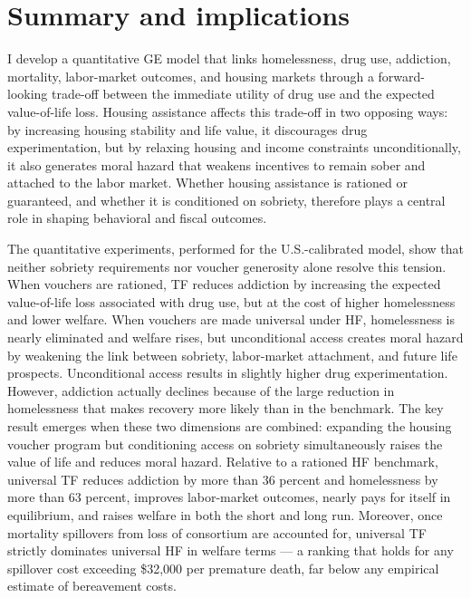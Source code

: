 \documentclass[parskip=full]{article}
\theoremstyle{plain}
\theoremstyle{definition}
\theoremstyle{remark}
\begin{document}
\section{Summary and implications}\label{sec:conclusion}

I develop a quantitative GE model that links homelessness, drug use, addiction, mortality, labor-market outcomes, and housing markets through a forward-looking trade-off between the immediate utility of drug use and the expected value-of-life loss. Housing assistance affects this trade-off in two opposing ways: by increasing housing stability and life value, it discourages drug experimentation, but by relaxing housing and income constraints unconditionally, it also generates moral hazard that weakens incentives to remain sober and attached to the labor market. Whether housing assistance is rationed or guaranteed, and whether it is conditioned on sobriety, therefore plays a central role in shaping behavioral and fiscal outcomes.

The quantitative experiments, performed for the U.S.-calibrated model, show that neither sobriety requirements nor voucher generosity alone resolve this tension. When vouchers are rationed, TF reduces addiction by increasing the expected value-of-life loss associated with drug use, but at the cost of higher homelessness and lower welfare. When vouchers are made universal under HF, homelessness is nearly eliminated and welfare rises, but unconditional access creates moral hazard by weakening the link between sobriety, labor-market attachment, and future life prospects. Unconditional access results in slightly higher drug experimentation. However, addiction actually declines because of the large reduction in homelessness that makes recovery more likely than in the benchmark. The key result emerges when these two dimensions are combined: expanding the housing voucher program but conditioning access on sobriety simultaneously raises the value of life and reduces moral hazard. Relative to a rationed HF benchmark, universal TF reduces addiction by more than 36 percent and homelessness by more than 63 percent, improves labor-market outcomes, 
nearly pays for itself in equilibrium, and raises welfare in both the short and long run. Moreover, once mortality spillovers from loss of consortium are accounted for, universal TF strictly dominates universal HF in welfare terms — a ranking that holds for any spillover cost exceeding \$32{,}000 per premature death, far below any empirical estimate of bereavement costs.
\end{document}
